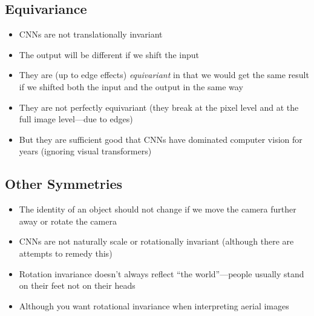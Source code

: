 \begin{slide}
\section{Equivariance}

\begin{PauseHighLight}
  \begin{itemize}
  \item CNNs are not translationally invariant\pause
  \item The output will be different if we shift the input\pause
  \item They are (up to edge effects) \emph{equivariant} in that we would get
    the same result if we shifted both the input and the output in the
    same way\pause
  \item They are not perfectly equivariant (they break at the pixel
    level and at the full image level---due to edges)\pause
  \item But they are sufficient good that CNNs have dominated computer
    vision for years\pause{} (ignoring visual transformers)\pauseb
  \end{itemize}
\end{PauseHighLight}

\end{slide}


\begin{slide}
\section{Other Symmetries}

\begin{PauseHighLight}
  \begin{itemize}
  \item The identity of an object should not change if we move the
    camera further away or rotate the camera\pause
  \item CNNs are not naturally scale or rotationally invariant\pause{}
    (although there are attempts to remedy this)\pauseb
  \item Rotation invariance doesn't always reflect ``the
    world''\pause---people usually stand on their feet not on their
    heads\pause
  \item Although you want rotational invariance when interpreting
    aerial images\pause
  \end{itemize}
\end{PauseHighLight}

\end{slide}

